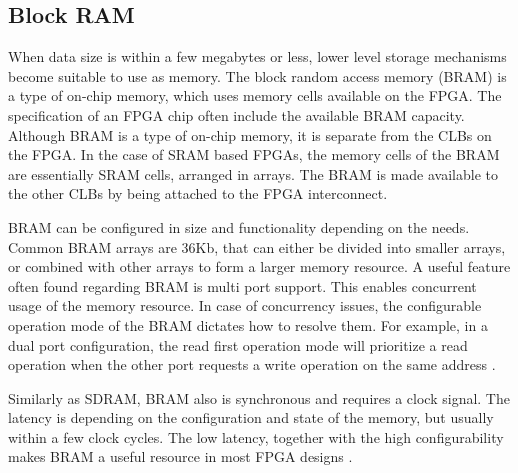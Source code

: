 \documentclass[12pt]{report}
\begin{document}


\subsection{Block RAM}
When data size is within a few megabytes or less, lower level storage mechanisms become suitable to use as memory. The block random access memory (BRAM) is a type of on-chip memory, which uses memory cells available on the FPGA. The specification of an FPGA chip often include the available BRAM capacity. Although BRAM is a type of on-chip memory, it is separate from the CLBs on the FPGA. In the case of SRAM based FPGAs, the memory cells of the BRAM are essentially SRAM cells, arranged in arrays. The BRAM is made available to the other CLBs by being attached to the FPGA interconnect.
\par
BRAM can be configured in size and functionality depending on the needs. Common BRAM arrays are 36Kb, that can either be divided into smaller arrays, or combined with other arrays to form a larger memory resource. A useful feature often found regarding BRAM is multi port support. This enables concurrent usage of the memory resource. In case of concurrency issues, the configurable operation mode of the BRAM dictates how to resolve them. For example, in a dual port configuration, the read first operation mode will prioritize a read operation when the other port requests a write operation on the same address \citep{XilMemMan}.
\par
\par
Similarly as SDRAM, BRAM also is synchronous and requires a clock signal. The latency is depending on the configuration and state of the memory, but usually within a few clock cycles. The low latency, together with the high configurability makes BRAM a useful resource in most FPGA designs \citep{XilMemMan}.
\end{document}
